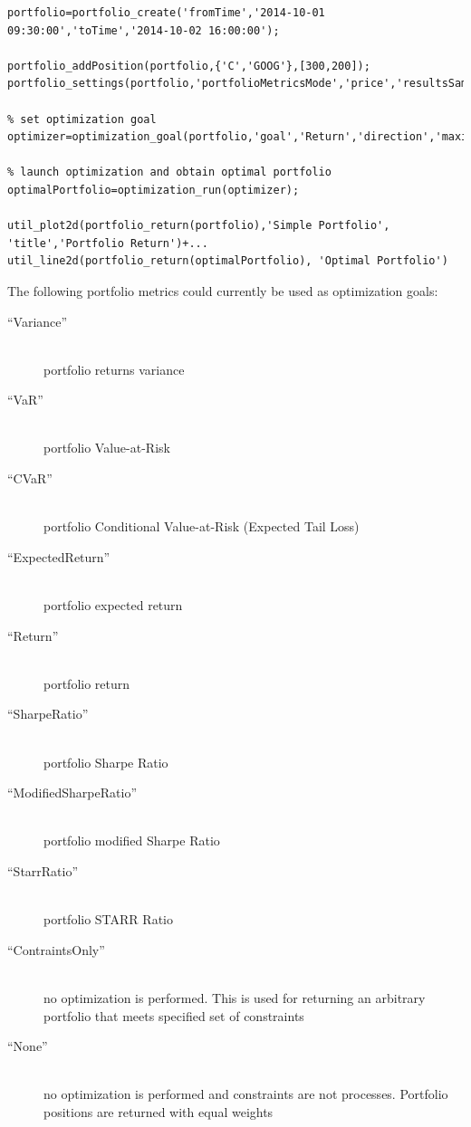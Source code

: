 \documentclass[letterpaper]{report}
\newcounter{N}
\begin{document}
\begin{lstlisting}
portfolio=portfolio_create('fromTime','2014-10-01 09:30:00','toTime','2014-10-02 16:00:00');

portfolio_addPosition(portfolio,{'C','GOOG'},[300,200]);
portfolio_settings(portfolio,'portfolioMetricsMode','price','resultsSamplingInterval','30m');

% set optimization goal
optimizer=optimization_goal(portfolio,'goal','Return','direction','maximize');

% launch optimization and obtain optimal portfolio
optimalPortfolio=optimization_run(optimizer);

util_plot2d(portfolio_return(portfolio),'Simple Portfolio', 'title','Portfolio Return')+...
util_line2d(portfolio_return(optimalPortfolio), 'Optimal Portfolio')
\end{lstlisting}

The following portfolio metrics could currently be used as optimization goals:

\begin{description} 
\item[``Variance''] \hfill \\ 
portfolio returns variance 
\item[``VaR''] \hfill \\ 
portfolio Value-at-Risk
\item[``CVaR''] \hfill \\ 
portfolio Conditional Value-at-Risk (Expected Tail Loss)
\item[``ExpectedReturn''] \hfill \\ 
portfolio expected return
\item[``Return''] \hfill \\
portfolio return
\item[``SharpeRatio''] \hfill \\
portfolio Sharpe Ratio
\item[``ModifiedSharpeRatio''] \hfill \\
portfolio modified Sharpe Ratio
\item[``StarrRatio''] \hfill \\
portfolio STARR Ratio
\item[``ContraintsOnly''] \hfill \\
no optimization is performed. This is used for returning an arbitrary portfolio
that meets specified set of constraints
\item[``None''] \hfill \\  
no optimization is performed and constraints are not processes.
Portfolio positions are returned with equal weights
\end{description}
\end{document}
